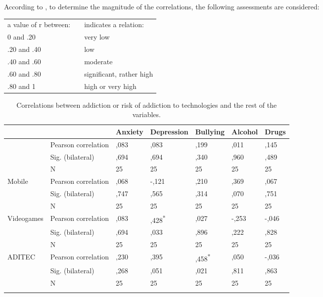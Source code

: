\documentclass[english]{textolivre}
\begin{document}
According to \textcite{morales2008estadistica}, %
to determine the magnitude of the correlations, the following assessments are considered:
\begin{center}
\begin{tabular}{l@{}c@{}l} 
a value of r between: & \hspace{10em} & indicates a relation: \\
0 and .20 & \dotfill & very low \\
.20 and .40 & \dotfill & low \\
.40 and .60 & \dotfill & moderate \\
.60 and .80 & \dotfill &  significant, rather high \\
.80 and 1 & \dotfill & high or very high 
\end{tabular}
\end{center}

\begin{table}[htpb]
\begin{threeparttable}
\caption{Correlations between addiction or risk of addiction to
technologies and the rest of the variables.}\label{tbl03}
\begin{tabular}{@{}lllllll@{}}
\toprule
& & Anxiety & Depression & Bullying & Alcohol & Drugs \tabularnewline
\midrule
\arrayrulecolor[gray]{.7}
\multirow{3}{*}{Internet} & Pearson correlation & ,083 & ,083 & ,199 & ,011 &
,145\tabularnewline
& Sig. (bilateral) & ,694 & ,694 & ,340 & ,960 & ,489 \tabularnewline
& N & 25 & 25 & 25 & 25 & 25 \tabularnewline
\midrule
\multirow{3}{*}{Mobile} & Pearson correlation & ,068 & -,121 & ,210 & ,369 &
,067\tabularnewline
& Sig. (bilateral) & ,747 & ,565 & ,314 & ,070 & ,751 \tabularnewline
& N & 25 & 25 & 25 & 25 & 25 \tabularnewline
\midrule
\multirow{3}{*}{Videogames} & Pearson correlation & ,083 & ,428\textsuperscript{*} & ,027
& -,253 & -,046\tabularnewline
& Sig. (bilateral) & ,694 & ,033 & ,896 & ,222 & ,828 \tabularnewline
& N & 25 & 25 & 25 & 25 & 25 \tabularnewline
\midrule
\multirow{3}{*}{ADITEC} & Pearson correlation & ,230 & ,395 & ,458\textsuperscript{*} & ,050 & -,036\tabularnewline
& Sig. (bilateral) & ,268 & ,051 & ,021 & ,811 & ,863 \tabularnewline
& N & 25 & 25 & 25 & 25 & 25 \tabularnewline
\arrayrulecolor{black}
\bottomrule
\end{tabular}
\end{threeparttable}
\end{table}
\end{document}
